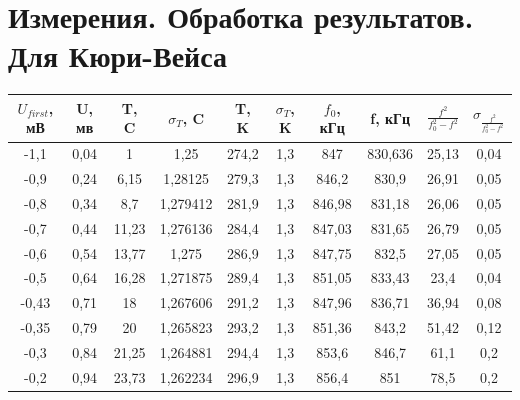 \documentclass[a4paper, 12pt]{article}%
\begin{document}
\section{Измерения. Обработка результатов. Для Кюри-Вейса}
\begin{table}[h]
\begin{tabular}{|c|c|c|c|c|c|c|c|c|c|}
\hline
$U_{first}$, мВ & U, мв & T, C  & $\sigma_T$, C & T, K  & $\sigma_T$, K & $f_0$, кГц & f, кГц  & $\frac{f^2}{f_0^2-f^2}$ & $\sigma_{\frac{f^2}{f_0^2-f^2}}$ \\ \hline
-1,1            & 0,04  & 1     & 1,25          & 274,2 & 1,3           & 847        & 830,636 & 25,13                   & 0,04                             \\ \hline
-0,9            & 0,24  & 6,15  & 1,28125       & 279,3 & 1,3           & 846,2      & 830,9   & 26,91                   & 0,05                             \\ \hline
-0,8            & 0,34  & 8,7   & 1,279412      & 281,9 & 1,3           & 846,98     & 831,18  & 26,06                   & 0,05                             \\ \hline
-0,7            & 0,44  & 11,23 & 1,276136      & 284,4 & 1,3           & 847,03     & 831,65  & 26,79                   & 0,05                             \\ \hline
-0,6            & 0,54  & 13,77 & 1,275         & 286,9 & 1,3           & 847,75     & 832,5   & 27,05                   & 0,05                             \\ \hline
-0,5            & 0,64  & 16,28 & 1,271875      & 289,4 & 1,3           & 851,05     & 833,43  & 23,4                    & 0,04                             \\ \hline
-0,43           & 0,71  & 18    & 1,267606      & 291,2 & 1,3           & 847,96     & 836,71  & 36,94                   & 0,08                             \\ \hline
-0,35           & 0,79  & 20    & 1,265823      & 293,2 & 1,3           & 851,36     & 843,2   & 51,42                   & 0,12                             \\ \hline
-0,3            & 0,84  & 21,25 & 1,264881      & 294,4 & 1,3           & 853,6      & 846,7   & 61,1                    & 0,2                              \\ \hline
-0,2            & 0,94  & 23,73 & 1,262234      & 296,9 & 1,3           & 856,4      & 851     & 78,5                    & 0,2                              \\ \hline

\end{tabular}
\end{table}
\end{document}
